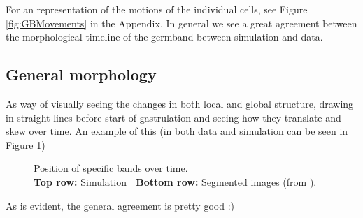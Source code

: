 For an representation of the motions of the individual cells, see Figure \ref{fig:GBMovements} in the Appendix.
In general we see a great agreement between the morphological timeline of the germband between simulation and data.


\subsection{General morphology}
As way of visually seeing the changes in both local and global structure, drawing in straight lines before start of gastrulation and seeing how they translate and skew over time. An example of this (in both data and simulation can be seen in Figure \ref{fig:band-movements-stas}) 

\begin{figure}[H]
    \centering
\end{figure}
\begin{figure}[H]
    \centering
    \caption{Position of specific bands over time.\\ \textbf{Top row:} Simulation | \textbf{Bottom row:}  Segmented images (from \cite{stern2022deconstructing}). \\}
    \label{fig:band-movements-stas}
\end{figure}

As is evident, the general agreement is pretty good :)


